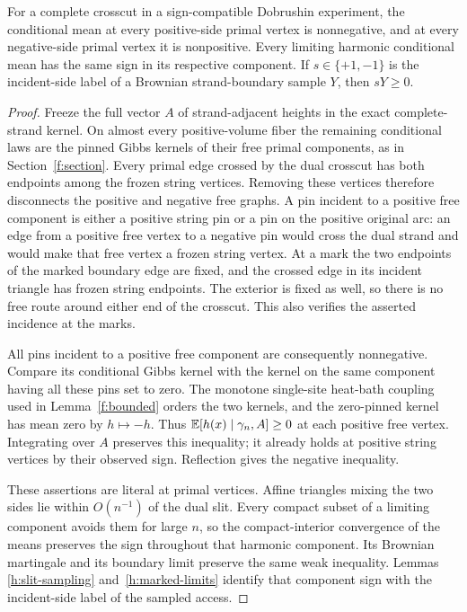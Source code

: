 \begin{lemma}\label{h:terminal-sign}
For a complete crosscut in a sign-compatible Dobrushin experiment, the
conditional mean at every positive-side primal vertex is nonnegative,
and at every negative-side primal vertex it is nonpositive. Every
limiting harmonic conditional mean has the same sign in its respective
component. If $s\in\{+1,-1\}$ is the incident-side label of a Brownian
strand-boundary sample $Y$, then $sY\ge0$.
\end{lemma}
\begin{proof}
Freeze the full vector $A$ of strand-adjacent heights in the exact
complete-strand kernel. On almost every positive-volume fiber the
remaining conditional laws are the pinned Gibbs kernels of their free
primal components, as in Section~\ref{f:section}. Every primal edge
crossed by the dual crosscut has both endpoints among the frozen string
vertices. Removing these vertices therefore disconnects the positive
and negative free graphs. A pin incident to a positive free component
is either a positive string pin or a pin on the positive original arc:
an edge from a positive free vertex to a negative pin would cross the
dual strand and would make that free vertex a frozen string vertex.
At a mark the two endpoints of the marked boundary edge are fixed, and
the crossed edge in its incident triangle has frozen string endpoints.
The exterior is fixed as well, so there is no free route around either
end of the crosscut. This also verifies the asserted incidence at the
marks.

All pins incident to a positive free component are consequently
nonnegative. Compare its conditional Gibbs kernel with the kernel on
the same component having all these pins set to zero. The monotone
single-site heat-bath coupling used in Lemma~\ref{f:bounded} orders the
two kernels, and the zero-pinned kernel has mean zero by $h\mapsto-h$.
Thus $\mathbb E[h(x)\mid\gamma_n,A]\ge0$ at each positive free vertex.
Integrating over $A$ preserves this inequality; it already holds at
positive string vertices by their observed sign. Reflection gives the
negative inequality.

These assertions are literal at primal vertices. Affine triangles
mixing the two sides lie within $O(n^{-1})$ of the dual slit. Every
compact subset of a limiting component avoids them for large $n$, so
the compact-interior convergence of the means preserves the sign
throughout that harmonic component. Its Brownian martingale and its
boundary limit preserve the same weak inequality. Lemmas
\ref{h:slit-sampling} and~\ref{h:marked-limits} identify that component
sign with the incident-side label of the sampled access.
\end{proof}

